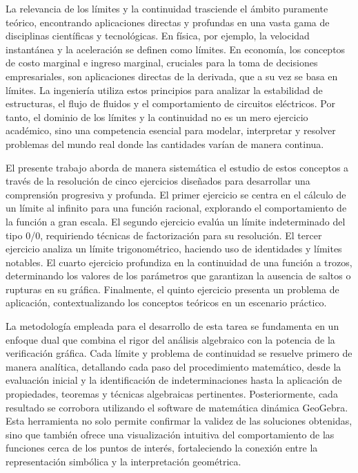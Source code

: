\documentclass{article}
\begin{document}
La relevancia de los límites y la continuidad trasciende el ámbito puramente teórico, encontrando aplicaciones directas y profundas en una vasta gama de disciplinas científicas y tecnológicas. En física, por ejemplo, la velocidad instantánea y la aceleración se definen como límites. En economía, los conceptos de costo marginal e ingreso marginal, cruciales para la toma de decisiones empresariales, son aplicaciones directas de la derivada, que a su vez se basa en límites. La ingeniería utiliza estos principios para analizar la estabilidad de estructuras, el flujo de fluidos y el comportamiento de circuitos eléctricos. Por tanto, el dominio de los límites y la continuidad no es un mero ejercicio académico, sino una competencia esencial para modelar, interpretar y resolver problemas del mundo real donde las cantidades varían de manera continua.

El presente trabajo aborda de manera sistemática el estudio de estos conceptos a través de la resolución de cinco ejercicios diseñados para desarrollar una comprensión progresiva y profunda. El primer ejercicio se centra en el cálculo de un límite al infinito para una función racional, explorando el comportamiento de la función a gran escala. El segundo ejercicio evalúa un límite indeterminado del tipo 0/0, requiriendo técnicas de factorización para su resolución. El tercer ejercicio analiza un límite trigonométrico, haciendo uso de identidades y límites notables. El cuarto ejercicio profundiza en la continuidad de una función a trozos, determinando los valores de los parámetros que garantizan la ausencia de saltos o rupturas en su gráfica. Finalmente, el quinto ejercicio presenta un problema de aplicación, contextualizando los conceptos teóricos en un escenario práctico.

La metodología empleada para el desarrollo de esta tarea se fundamenta en un enfoque dual que combina el rigor del análisis algebraico con la potencia de la verificación gráfica. Cada límite y problema de continuidad se resuelve primero de manera analítica, detallando cada paso del procedimiento matemático, desde la evaluación inicial y la identificación de indeterminaciones hasta la aplicación de propiedades, teoremas y técnicas algebraicas pertinentes. Posteriormente, cada resultado se corrobora utilizando el software de matemática dinámica GeoGebra. Esta herramienta no solo permite confirmar la validez de las soluciones obtenidas, sino que también ofrece una visualización intuitiva del comportamiento de las funciones cerca de los puntos de interés, fortaleciendo la conexión entre la representación simbólica y la interpretación geométrica.
\end{document}
